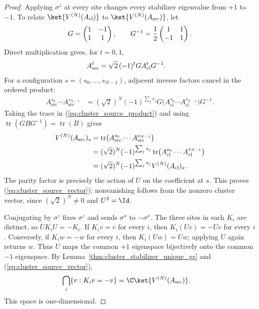 \begin{proof}
    \leanok
    Applying $\sigma^z$ at every site changes every stabilizer eigenvalue from
    $+1$ to $-1$. To relate $\ket{V^{(N)}(A_{\mathrm{cl}})}$ to
    $\ket{V^{(N)}(A_{\mathrm{src}})}$, let
    \begin{align}
        G=\begin{pmatrix}1&-1\\1&1\end{pmatrix},\qquad
        G^{-1}=\frac12\begin{pmatrix}1&1\\-1&1\end{pmatrix}.\notag
    \end{align}
    Direct multiplication gives, for $t=0,1$,
    \begin{align}
        A_{\mathrm{src}}^t
         & =\sqrt2\,(-1)^tG A_{\mathrm{cl}}^tG^{-1}.\notag
    \end{align}
    For a configuration $s=(s_0,\ldots,s_{N-1})$, adjacent inverse factors
    cancel in the ordered product:
    \begin{align}
        A_{\mathrm{src}}^{s_0}\cdots A_{\mathrm{src}}^{s_{N-1}}
         & =(\sqrt2)^N(-1)^{\sum_j s_j}
        G\bigl(A_{\mathrm{cl}}^{s_0}\cdots A_{\mathrm{cl}}^{s_{N-1}}\bigr)G^{-1}.
        \label{eq:cluster_source_product}
    \end{align}
    Taking the trace in (\ref{eq:cluster_source_product}) and using
    $\operatorname{tr}(GBG^{-1})=\operatorname{tr}(B)$ gives
    \begin{align}
        V^{(N)}(A_{\mathrm{src}})_s
         & =\operatorname{tr}\bigl(A_{\mathrm{src}}^{s_0}\cdots A_{\mathrm{src}}^{s_{N-1}}\bigr)\notag \\
         & =(\sqrt2)^N(-1)^{\sum_j s_j}
        \operatorname{tr}\bigl(A_{\mathrm{cl}}^{s_0}\cdots A_{\mathrm{cl}}^{s_{N-1}}\bigr)\notag       \\
         & =(\sqrt2)^N(-1)^{\sum_j s_j}V^{(N)}(A_{\mathrm{cl}})_s.\notag
    \end{align}
    The parity factor is precisely the action of $U$ on the coefficient at
    $s$. This proves (\ref{eq:cluster_source_vector}); nonvanishing follows
    from the nonzero cluster vector, since $(\sqrt2)^N\ne0$ and $U^2=\Id$.

    Conjugating by $\sigma^z$ fixes $\sigma^z$ and sends $\sigma^x$ to
    $-\sigma^x$. The three sites in each $K_i$ are distinct, so $UK_iU=-K_i$.
    If $K_iv=v$ for every $i$, then $K_i(Uv)=-Uv$ for every $i$.
    Conversely, if $K_iw=-w$ for every $i$, then $K_i(Uw)=Uw$; applying $U$
    again returns $w$. Thus $U$ maps the common $+1$ eigenspace bijectively
    onto the common $-1$ eigenspace. By
    Lemma~\ref{thm:cluster_stabilizer_unique_gs} and
    (\ref{eq:cluster_source_vector}),
    \begin{align}
        \bigcap_i\{v:K_iv=-v\} & =\C\ket{V^{(N)}(A_{\mathrm{src}})}.\notag
    \end{align}
    This space is one-dimensional.


\end{proof}
